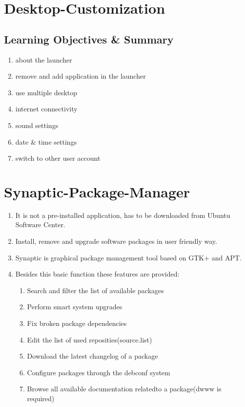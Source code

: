 \documentclass[12pt, a4paper]{report}
\begin{document}
\chapter{Desktop-Customization}
\section{Learning Objectives \& Summary}
\begin{enumerate}
\item about the launcher
\item remove and add application in the launcher
\item use multiple desktop
\item internet connectivity
\item sound settings
\item date \& time settings
\item switch to other user account
\end{enumerate}
%
\chapter{Synaptic-Package-Manager}
\begin{enumerate}
\item It is not a pre-installed application, has to be downloaded from Ubuntu Software Center.
\item Install, remove and upgrade software packages in user friendly way.
\item Synaptic is graphical package management tool based on GTK+ and APT.
\item Besides this basic function these features are provided:
\begin{enumerate}
\item Search and filter the list of available packages
\item Perform smart system upgrades
\item Fix broken package dependencies
\item Edit the list of used reposities(source.list)
\item Download the latest changelog of a package
\item Configure packages through the debconf system
\item Browse all available documentation relatedto a package(dwww is required)
\end{enumerate}
\end{enumerate}
%
\end{document}
